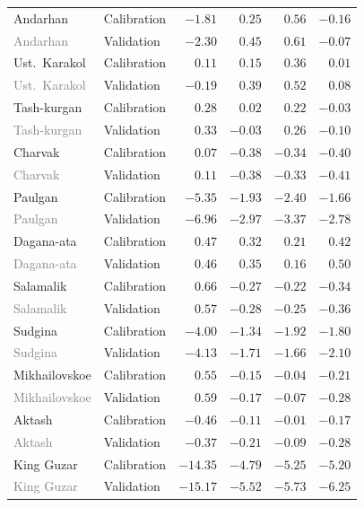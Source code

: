 \begin{longtable}{llrrrr}
\addlinespace
Andarhan & Calibration & $-1.81$ & $0.25$ & $0.56$ & $-0.16$ \\
\textcolor{gray}{Andarhan} & Validation & $-2.30$ & $0.45$ & $0.61$ & $-0.07$ \\
\addlinespace
Ust.\  Karakol & Calibration & $0.11$ & $0.15$ & $0.36$ & $0.01$ \\
\textcolor{gray}{Ust.\  Karakol} & Validation & $-0.19$ & $0.39$ & $0.52$ & $0.08$ \\
\addlinespace
Tash-kurgan & Calibration & $0.28$ & $0.02$ & $0.22$ & $-0.03$ \\
\textcolor{gray}{Tash-kurgan} & Validation & $0.33$ & $-0.03$ & $0.26$ & $-0.10$ \\
\addlinespace
Charvak & Calibration & $0.07$ & $-0.38$ & $-0.34$ & $-0.40$ \\
\textcolor{gray}{Charvak} & Validation & $0.11$ & $-0.38$ & $-0.33$ & $-0.41$ \\
\addlinespace
Paulgan & Calibration & $-5.35$ & $-1.93$ & $-2.40$ & $-1.66$ \\
\textcolor{gray}{Paulgan} & Validation & $-6.96$ & $-2.97$ & $-3.37$ & $-2.78$ \\
\addlinespace
Dagana-ata & Calibration & $0.47$ & $0.32$ & $0.21$ & $0.42$ \\
\textcolor{gray}{Dagana-ata} & Validation & $0.46$ & $0.35$ & $0.16$ & $0.50$ \\
\addlinespace
Salamalik & Calibration & $0.66$ & $-0.27$ & $-0.22$ & $-0.34$ \\
\textcolor{gray}{Salamalik} & Validation & $0.57$ & $-0.28$ & $-0.25$ & $-0.36$ \\
\addlinespace
Sudgina & Calibration & $-4.00$ & $-1.34$ & $-1.92$ & $-1.80$ \\
\textcolor{gray}{Sudgina} & Validation & $-4.13$ & $-1.71$ & $-1.66$ & $-2.10$ \\
\addlinespace
Mikhailovskoe & Calibration & $0.55$ & $-0.15$ & $-0.04$ & $-0.21$ \\
\textcolor{gray}{Mikhailovskoe} & Validation & $0.59$ & $-0.17$ & $-0.07$ & $-0.28$ \\
\addlinespace
Aktash & Calibration & $-0.46$ & $-0.11$ & $-0.01$ & $-0.17$ \\
\textcolor{gray}{Aktash} & Validation & $-0.37$ & $-0.21$ & $-0.09$ & $-0.28$ \\
\addlinespace
King Guzar & Calibration & $-14.35$ & $-4.79$ & $-5.25$ & $-5.20$ \\
\textcolor{gray}{King Guzar} & Validation & $-15.17$ & $-5.52$ & $-5.73$ & $-6.25$ \\

\end{longtable}
